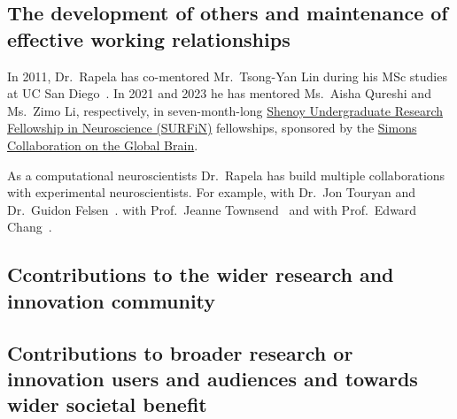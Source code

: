 \subsection{The development of others and maintenance of effective working relationships}

In 2011, Dr.~Rapela has co-mentored Mr.~Tsong-Yan Lin during his MSc studies at
UC San Diego~\citep{rapelaEtAl12-eyeTracking}. In 2021 and 2023 he has mentored
Ms.~Aisha Qureshi and Ms.~Zimo Li, respectively, in seven-month-long
\href{https://www.simonsfoundation.org/grant/shenoy-undergraduate-research-fellowship-in-neuroscience-surfin/}{Shenoy
Undergraduate Research Fellowship in Neuroscience (SURFiN)} fellowships,
sponsored by the
\href{https://www.simonsfoundation.org/collaborations/global-brain/}{Simons
Collaboration on the Global Brain}.

As a computational neuroscientists Dr.~Rapela has build multiple collaborations
with experimental neuroscientists. For example,
%
with Dr.~Jon Touryan and Dr.~Guidon
Felsen~\citep{rapelaEtAl06,rapelaEtAl10}.
%
with Prof.~Jeanne Townsend~\citep{rapelaEtAl12-attentionSwitch,rapelaEtAl12-eyeTracking,rapelaEtAl18-avshift}
and with Prof.~Edward Chang~\citep{rapelaEtAlInPrepEDMs,rapelaInPrepTWsInSpeech,rapelaInPrepSyncTWs,rapelaInPrepSyncTWsII}.




\subsection{Ccontributions to the wider research and innovation community}


\subsection{Contributions to broader research or innovation users and audiences and towards wider societal benefit}


